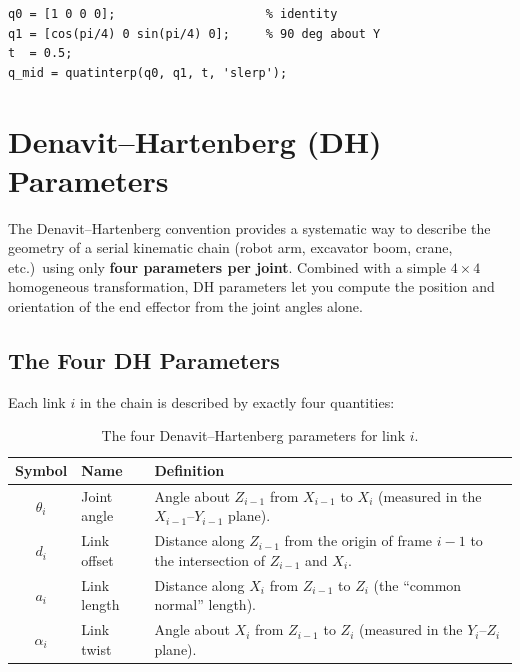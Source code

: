 \documentclass[12pt,a4paper]{article}
\begin{document}
\begin{lstlisting}[style=matlab, caption={SLERP between two orientations.}]
q0 = [1 0 0 0];                     % identity
q1 = [cos(pi/4) 0 sin(pi/4) 0];     % 90 deg about Y
t  = 0.5;
q_mid = quatinterp(q0, q1, t, 'slerp');
\end{lstlisting}

\section{Denavit--Hartenberg (DH) Parameters}

The Denavit--Hartenberg convention provides a systematic way to describe
the geometry of a serial kinematic chain (robot arm, excavator boom,
crane, etc.)\ using only \textbf{four parameters per joint}.  Combined
with a simple $4\times4$ homogeneous transformation, DH parameters let
you compute the position and orientation of the end effector from the
joint angles alone.

\subsection{The Four DH Parameters}

Each link $i$ in the chain is described by exactly four quantities:

\begin{table}[h]
\centering
\begin{tabular}{@{}clp{8.5cm}@{}}
\toprule
\textbf{Symbol} & \textbf{Name} & \textbf{Definition} \\
\midrule
$\theta_i$ & Joint angle &
  Angle about $Z_{i-1}$ from $X_{i-1}$ to $X_i$
  (measured in the $X_{i-1}$--$Y_{i-1}$ plane). \\[4pt]
$d_i$      & Link offset &
  Distance along $Z_{i-1}$ from the origin of frame $i{-}1$
  to the intersection of $Z_{i-1}$ and $X_i$. \\[4pt]
$a_i$      & Link length &
  Distance along $X_i$ from $Z_{i-1}$ to $Z_i$
  (the ``common normal'' length). \\[4pt]
$\alpha_i$ & Link twist &
  Angle about $X_i$ from $Z_{i-1}$ to $Z_i$
  (measured in the $Y_i$--$Z_i$ plane). \\
\bottomrule
\end{tabular}
\caption{The four Denavit--Hartenberg parameters for link $i$.}
\end{table}
\end{document}
